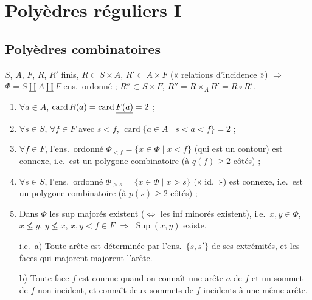 \documentclass[11pt,a4paper]{article}
\begin{document}
\section*{Polyèdres réguliers I}


\subsection*{Polyèdres combinatoires}


$S$, $A$, $F$, $R$, $R'$ finis,
$R \subset S \times A$, $R' \subset A \times F$ (« relations d'incidence »)
$\Rightarrow$ $\Phi = S \amalg A \amalg F$ ens.\ ordonné ;
$R'' \subset S \times F$, $R'' = R \times_A R' = R \circ R'$.

\begin{enumerate}
  \item[1)] $\forall a \in A$, $\operatorname{card} R(a) = \operatorname{card}
  \uncertain{F(a)} = 2$ ;
  \item[2)] $\forall s \in S$, $\forall f \in F$ avec $s < f$,
  $\operatorname{card}\{a \in A \mid s < a < f\} = 2$ ;
  \item[3)] $\forall f \in F$, l'ens.\ ordonné $\Phi_{<f} = \{x \in \Phi \mid
  x < f\}$ (qui est un contour) est connexe, i.e.\ est un polygone
  combinatoire (à $q(f) \geq 2$ côtés) ;
  \item[3')] $\forall s \in S$, l'ens.\ ordonné $\Phi_{>s} = \{x \in \Phi \mid
  x > s\}$ (« id.\ ») est connexe, i.e.\ est un polygone combinatoire (à
  $p(s) \geq 2$ côtés) ;
  \item[4)] Dans $\Phi$ les sup majorés existent ($\Longleftrightarrow$ les
  inf minorés existent), i.e.\ $x, y \in \Phi$, $x \not\leq y$,
  $y \not\leq x$, $x, y < f \in F$ $\Rightarrow$ $\operatorname{Sup}(x,y)$
  existe,

  i.e.\ a) Toute arête est déterminée par l'ens.\ $\{s, s'\}$ de ses
  extrémités, et les faces qui majorent  majorent
  l'arête.

  b) Toute face $f$ est connue quand on connaît une arête $a$ de $f$ et un
  sommet de $f$ non incident, et  connaît deux sommets de
  $f$  incidents à une même arête.
\end{enumerate}
\end{document}
